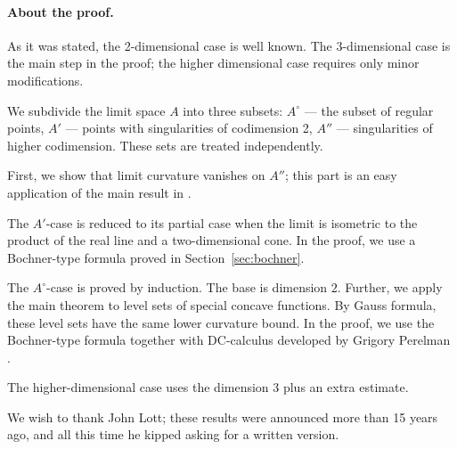 \paragraph{About the proof.}
As it was stated, the 2-dimensional case is well known.
The 3-dimensional case is the main step in the proof;
the higher dimensional case requires only minor modifications.

We subdivide the limit space $A$ into
three subsets: $A^\circ$ --- the subset of regular 
points, $A'$ --- points with singularities of codimension 2,
$A''$ --- singularities of higher codimension.
These sets are treated independently.

First, we show that limit curvature vanishes on $A''$; 
this part is an easy application of the main result in \cite{petrunin-SC}.

The $A'$-case is reduced to its partial case when the limit is isometric to the product of the real line and a two-dimensional cone.
In the proof, we use a Bochner-type formula proved in Section~\ref{sec:bochner}.

The $A^\circ$-case is proved by induction.
The base is dimension $2$.
Further, we apply the main theorem to level sets of special concave functions.
By Gauss formula, these level sets have the same lower curvature bound. 
In the proof, we use the Bochner-type formula together with DC-calculus developed by Grigory Perelman \cite{PerDC}.

The higher-dimensional case uses the dimension 3 plus an extra estimate.

We wish to thank John Lott; these results were announced more than 15 years ago, and all this time he kipped asking for a written version.
